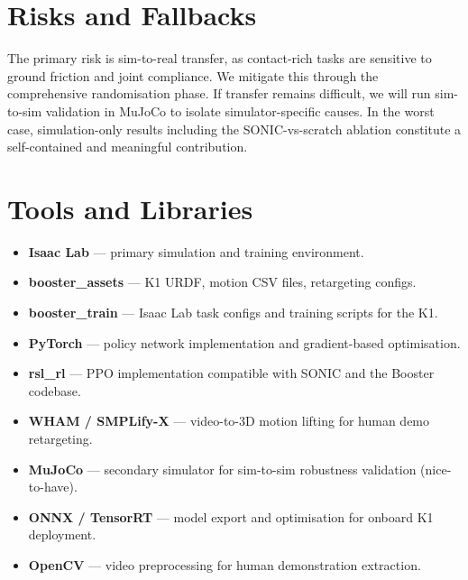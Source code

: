 \documentclass[12pt]{article}
\begin{document}
\section{Risks and Fallbacks}
The primary risk is sim-to-real transfer, as contact-rich tasks are sensitive to ground friction and joint compliance. We mitigate this through the comprehensive randomisation phase. If transfer remains difficult, we will run sim-to-sim validation in MuJoCo to isolate simulator-specific causes. In the worst case, simulation-only results including the SONIC-vs-scratch ablation constitute a self-contained and meaningful contribution.

\section{Tools and Libraries}
\begin{itemize}[noitemsep]
    \item \textbf{Isaac Lab} --- primary simulation and training environment.
    \item \textbf{booster\_assets} --- K1 URDF, motion CSV files, retargeting configs.
    \item \textbf{booster\_train} --- Isaac Lab task configs and training scripts for the K1.
    \item \textbf{PyTorch} --- policy network implementation and gradient-based optimisation.
    \item \textbf{rsl\_rl} --- PPO implementation compatible with SONIC and the Booster codebase.
    \item \textbf{WHAM / SMPLify-X} --- video-to-3D motion lifting for human demo retargeting.
    \item \textbf{MuJoCo} --- secondary simulator for sim-to-sim robustness validation (nice-to-have).
    \item \textbf{ONNX / TensorRT} --- model export and optimisation for onboard K1 deployment.
    \item \textbf{OpenCV} --- video preprocessing for human demonstration extraction.
\end{itemize}
\end{document}
